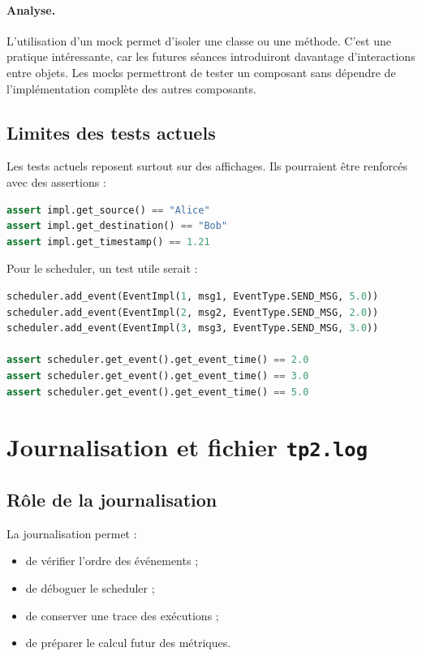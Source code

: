 \documentclass{article}
\begin{document}
\paragraph{Analyse.}
L’utilisation d’un mock permet d’isoler une classe ou une méthode. C’est une pratique intéressante, car les futures séances introduiront davantage d’interactions entre objets. Les mocks permettront de tester un composant sans dépendre de l’implémentation complète des autres composants.

\subsection{Limites des tests actuels}

Les tests actuels reposent surtout sur des affichages. Ils pourraient être renforcés avec des assertions :

\begin{lstlisting}[language=Python, caption=Exemple d'assertions]
assert impl.get_source() == "Alice"
assert impl.get_destination() == "Bob"
assert impl.get_timestamp() == 1.21
\end{lstlisting}

Pour le scheduler, un test utile serait :

\begin{lstlisting}[language=Python, caption=Test conceptuel du scheduler]
scheduler.add_event(EventImpl(1, msg1, EventType.SEND_MSG, 5.0))
scheduler.add_event(EventImpl(2, msg2, EventType.SEND_MSG, 2.0))
scheduler.add_event(EventImpl(3, msg3, EventType.SEND_MSG, 3.0))

assert scheduler.get_event().get_event_time() == 2.0
assert scheduler.get_event().get_event_time() == 3.0
assert scheduler.get_event().get_event_time() == 5.0
\end{lstlisting}

\section{Journalisation et fichier \texttt{tp2.log}}

\subsection{Rôle de la journalisation}

La journalisation permet :
\begin{itemize}[leftmargin=*]
    \item de vérifier l’ordre des événements ;
    \item de déboguer le scheduler ;
    \item de conserver une trace des exécutions ;
    \item de préparer le calcul futur des métriques.
\end{itemize}
\end{document}
